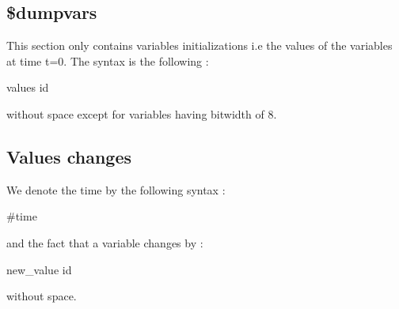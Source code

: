 \documentclass[a4paper]{article}
\begin{document}
\subsection{\$dumpvars}
This section only contains variables initializations i.e the values of the variables at time t=0.
The syntax is the following : 
\begin{center}
values id
\end{center}
without space except for variables having bitwidth of 8.
\subsection{Values changes}
We denote the time by the following syntax :
\begin{center}
\#time
\end{center}
and the fact that a variable changes by :
\begin{center}
new\_value id
\end{center}
without space.
\end{document}
